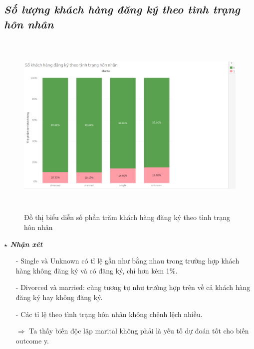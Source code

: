 \documentclass{report}
\begin{document}
\subsection{\textit{Số lượng khách hàng đăng ký theo tình trạng hôn nhân}}
         \begin{center}
        \begin{figure}[htp]
    	\begin{center}
    		\includegraphics[width=15cm, height=9cm]{images/hinh3.png}
    	\end{center}
    		\caption{Đồ thị biểu diễn số phần trăm khách hàng đăng ký theo tình trạng hôn nhân}
    \end{figure}
    \end{center}
    \fontsize{13}{14}\selectfont \textbf{$\star$\textit{ Nhận xét}}
    \begin{enumerate}
        \item[- ] Single và Unknown có tỉ lệ gần như bằng nhau trong trường hợp khách hàng không đăng ký và có đăng ký, chỉ hơn kém 1\%.
        \item[- ] Divorced và married: cũng tương tự như trường hợp trên về cả khách hàng đăng ký hay không đăng ký.
        \item[- ] Các tỉ lệ theo tình trạng hôn nhân không chênh lệch nhiều.
        \item [$\Rightarrow$] Ta thấy biến độc lập marital không phải là yếu tố dự đoán tốt cho biến outcome y.
    \end{enumerate}
\end{document}
